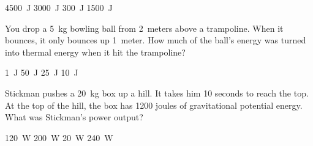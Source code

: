 \documentclass[answers,dvipsnames]{exam}
\begin{document}
\begin{questions}
\begin{minipage}{0.3\textwidth}
    \centering
    \begin{randomizechoices}[norandomize]
        \choice \SI{4500}{J}
        \correctchoice \SI{3000}{J}
        \choice \SI{300}{J}
        \choice \SI{1500}{J}
    \end{randomizechoices}
\end{minipage}%
\begin{minipage}{0.4\textwidth}
    \centering
\end{minipage}

\question
You drop a \SI{5}{kg} bowling ball from \SI{2}{meters} above a trampoline. When it bounces, it only bounces up \SI{1}{meter}. How much of the ball's energy was turned into thermal energy when it hit the trampoline?

\begin{randomizechoices}[norandomize]
    \choice \SI{1}{J}
    \correctchoice \SI{50}{J}
    \choice \SI{25}{J}
    \choice \SI{10}{J}
\end{randomizechoices}

\question
Stickman pushes a \SI{20}{kg} box up a hill. It takes him 10 seconds to reach the top. At the top of the hill, the box has 1200 joules of gravitational potential energy. What was Stickman's power output?

\begin{minipage}{0.3\textwidth}
    \begin{randomizechoices}[norandomize]
        \correctchoice \SI{120}{W}
        \choice \SI{200}{W}
        \choice \SI{20}{W}
        \choice \SI{240}{W}
    \end{randomizechoices}
\end{minipage}%
\begin{minipage}{0.6\textwidth}
\end{minipage}


\end{questions}
\end{document}
